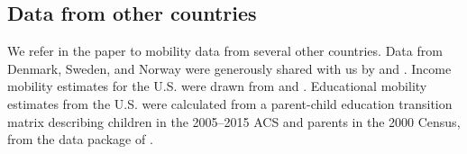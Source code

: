 \subsection{Data from other countries}

We refer in the paper to mobility data from several other
countries. Data from Denmark, Sweden, and Norway were generously
shared with us by  and
. Income mobility estimates for the U.S. were
drawn from  and
. Educational mobility estimates from the
U.S. were calculated from a parent-child education transition matrix
describing children in the 2005--2015 ACS and parents in the 2000
Census, from the data package of .

